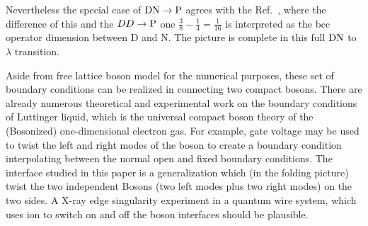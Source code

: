 
Nevertheless the special case of ${\rm DN} \rightarrow {\rm P}$ agrees with the Ref.~, where the difference of this and the $DD \rightarrow {\rm P}$ one  $\frac{3}{8}- \frac{1}{4} = \frac{1}{16} $ is interpreted as the bcc operator dimension between D and N. The picture is complete in this full ${\rm DN}$ to $\lambda $ transition. 


Aside from free lattice boson model for the numerical purposes, these set of boundary conditions can be realized in connecting two compact bosons. There are already numerous theoretical and experimental work on the boundary conditions of Luttinger liquid\cite{schmeltzer_zero_1999,anfuso_luttinger_2003,voit_bounded_2000,fabrizio_interacting_1995,egger_applying_1998}, which is the universal compact boson theory of the (Bosonized) one-dimensional electron gas\cite{giamarchi_quantum_2015}. For example, gate voltage \cite{egger_applying_1998} may be used to twist the left and right modes of the boson to create a boundary condition interpolating between the normal open and fixed boundary conditions. The interface studied in this paper is a generalization which (in the folding picture) twist the two independent Bosons (two left modes plus two right modes) on the two sides. A X-ray edge singularity experiment in a quantum wire system, which uses ion to switch on and off the boson interfaces should be plausible. 


